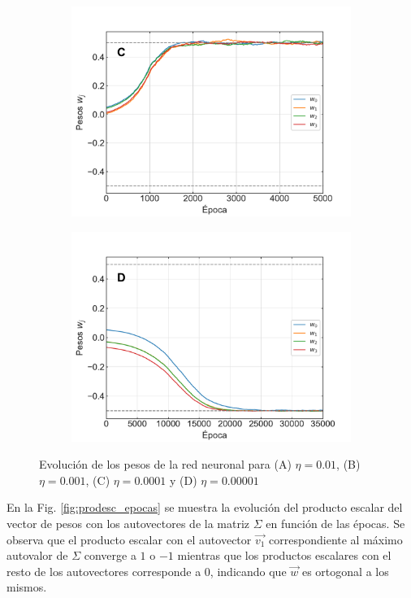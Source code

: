 \documentclass[11pt,twocolumn,twoside]{opticajnl}
\begin{document}
\begin{figure}[h]
\begin{subfigure}[b]{0.49\linewidth}
            \includegraphics[width=1.1\textwidth]{Figuras/pesos_lr_0.0001.pdf}
         \end{subfigure}
         \begin{subfigure}[b]{0.49\linewidth}
            \centering
            \includegraphics[width=1.1\textwidth]{Figuras/pesos_lr_1e-05.pdf}
         \end{subfigure}
    \caption{Evolución de los pesos de la red neuronal para (A) $\eta=0.01$, (B) $\eta=0.001$, (C) $\eta=0.0001$ y (D) $\eta=0.00001$} 
    \label{fig:pesos_epocas}
\end{figure}

En la Fig. \ref{fig:prodesc_epocas} se muestra la evolución del producto escalar del vector de pesos con los autovectores de la matriz $\Sigma$ en función de las épocas. Se observa que el producto escalar con el autovector $\vec{v_1}$ correspondiente al máximo autovalor de $\Sigma$ converge a $1$ o $-1$ mientras que los productos escalares con el resto de los autovectores corresponde a 0, indicando que $\vec{w}$ es ortogonal a los mismos.
\end{document}
